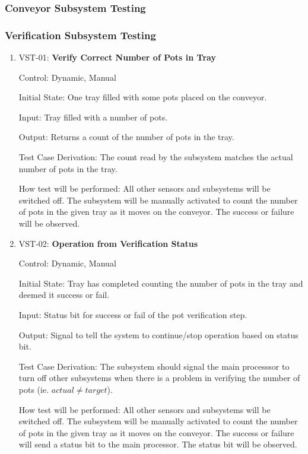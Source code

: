 \documentclass[12pt, titlepage]{article}
\begin{document}
\subsubsection{Conveyor Subsystem Testing}


\subsubsection{Verification Subsystem Testing}

\begin{enumerate}
  \item{VST-01: \textbf{Verify Correct Number of Pots in Tray}}
  
  Control: Dynamic, Manual
            
  Initial State: One tray filled with some pots placed on the conveyor.
            
  Input: Tray filled with a number of pots.
            
  Output: Returns a count of the number of pots in the tray.
  
  Test Case Derivation: The count read by the subsystem matches the actual number
  of pots in the tray.
            
  How test will be performed: All other sensors and subsystems will be switched off. 
  The subsystem will be manually activated to count the number of pots in the given tray as it moves on the conveyor.
  The success or failure will be observed.\\

  \item{VST-02: \textbf{Operation from Verification Status}}
  
  Control: Dynamic, Manual

  Initial State: Tray has completed counting the number of pots in the tray and deemed it success or fail.

  Input: Status bit for success or fail of the pot verification step.

  Output: Signal to tell the system to continue/stop operation based on status bit.

  Test Case Derivation: The subsystem should signal the main processsor to turn off other subsystems
  when there is a problem in verifying the number of pots (ie. $ actual \neq target $).

  How test will be performed: All other sensors and subsystems will be switched off. 
  The subsystem will be manually activated to count the number of pots in the given tray as it moves on the conveyor.
  The success or failure will send a status bit to the main processor. The status bit will be observed.

\end{enumerate}
\end{document}
